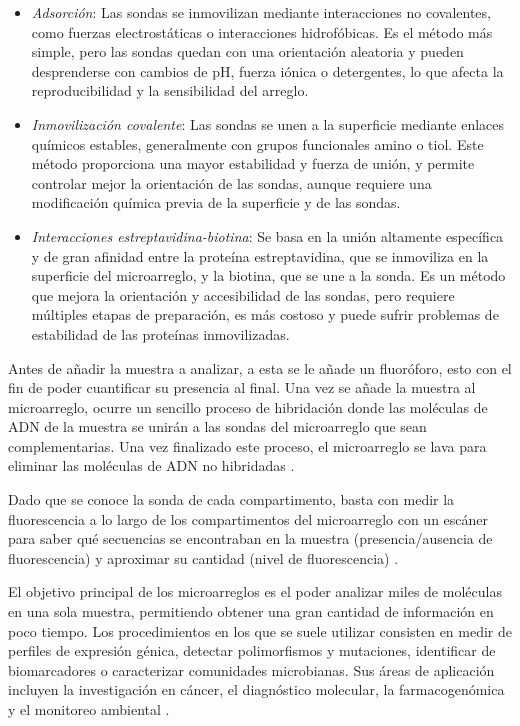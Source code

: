 \documentclass{AsignaturaResumen}
\begin{document}
\begin{itemize}
        \item \emph{Adsorción}: Las sondas se inmovilizan mediante interacciones no covalentes, como fuerzas electrostáticas o interacciones hidrofóbicas. Es el método más simple, pero las sondas quedan con una orientación aleatoria y pueden desprenderse con cambios de pH, fuerza iónica o detergentes, lo que afecta la reproducibilidad y la sensibilidad del arreglo.
    \item \emph{Inmovilización covalente}: Las sondas se unen a la superficie mediante enlaces químicos estables, generalmente con grupos funcionales amino o tiol. Este método proporciona una mayor estabilidad y fuerza de unión, y permite controlar mejor la orientación de las sondas, aunque requiere una modificación química previa de la superficie y de las sondas.
    \item \emph{Interacciones estreptavidina-biotina}: Se basa en la unión altamente específica y de gran afinidad entre la proteína estreptavidina, que se inmoviliza en la superficie del microarreglo, y la biotina, que se une a la sonda. Es un método que mejora la orientación y accesibilidad de las sondas, pero requiere múltiples etapas de preparación, es más costoso y puede sufrir problemas de estabilidad de las proteínas inmovilizadas. 
\end{itemize}

Antes de añadir la muestra a analizar, a esta se le añade un fluoróforo, esto con el fin de poder cuantificar su presencia al final. Una vez se añade la muestra al microarreglo, ocurre un sencillo proceso de hibridación donde las moléculas de ADN de la muestra se unirán a las sondas del microarreglo que sean complementarias. Una vez finalizado este proceso, el microarreglo se lava para eliminar las moléculas de ADN no hibridadas \citep{govindarajanMicroarrayItsApplications2012,jaksikMicroarrayExperimentsFactors2015}.

Dado que se conoce la sonda de cada compartimento, basta con medir la fluorescencia a lo largo de los compartimentos del microarreglo con un escáner para saber qué secuencias se encontraban en la muestra (presencia/ausencia de fluorescencia) y aproximar su cantidad (nivel de fluorescencia) \citep{govindarajanMicroarrayItsApplications2012,jaksikMicroarrayExperimentsFactors2015}.

El objetivo principal de los microarreglos es el poder analizar miles de moléculas en una sola muestra, permitiendo obtener una gran cantidad de información en poco tiempo. Los procedimientos en los que se suele utilizar consisten en medir de perfiles de expresión génica, detectar polimorfismos y mutaciones, identificar de biomarcadores o caracterizar comunidades microbianas. Sus áreas de aplicación incluyen la investigación en cáncer, el diagnóstico molecular, la farmacogenómica y el monitoreo ambiental \citep{govindarajanMicroarrayItsApplications2012, jaksikMicroarrayExperimentsFactors2015}.
\end{document}
